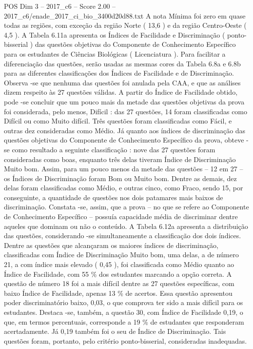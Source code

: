 \begin{textsample}{POS Dim 3 – 2017\_c6 – Score 2.00 – 2017\_c6/enade\_2017\_ci\_bio\_3400d20d88.txt}
A nota Mínima foi zero em quase todas as regiões, com exceção da região Norte ( 13,6 ) e da região Centro-Oeste ( 4,5 ).
A Tabela 6.11a apresenta os Índices de Facilidade e Discriminação ( ponto-bisserial ) das questões objetivas do Componente de Conhecimento Específico para os estudantes de Ciências Biológicas ( Licenciatura ).
Para facilitar a diferenciação das questões, serão usadas as mesmas cores da Tabela 6.8a e 6.8b para as diferentes classificações dos Índices de Facilidade e de Discriminação.
Observa -se que nenhuma das questões foi anulada pela CAA, e que as análises dizem respeito às 27 questões válidas.
A partir do Índice de Facilidade obtido, pode -se concluir que um pouco mais da metade das questões objetivas da prova foi considerada, pelo menos, Difícil : das 27 questões, 14 foram classificadas como Difícil ou como Muito difícil.
Três questões foram classificadas como Fácil, e outras dez consideradas como Médio.
Já quanto aos índices de discriminação das questões objetivas do Componente de Conhecimento Específico da prova, obteve -se como resultado a seguinte classificação : nove das 27 questões foram consideradas como boas, enquanto três delas tiveram Índice de Discriminação Muito bom.
Assim, para um pouco menos da metade das questões – 12 em 27 – os Índices de Discriminação foram Bom ou Muito bom.
Dentre as demais, dez delas foram classificadas como Médio, e outras cinco, como Fraco, sendo 15, por conseguinte, a quantidade de questões nos dois patamares mais baixos de discriminação.
Constata -se, assim, que a prova – no que se refere ao Componente de Conhecimento Específico – possuía capacidade média de discriminar dentre aqueles que dominam ou não o conteúdo.
A Tabela 6.12a apresenta a distribuição das questões, considerando -se simultaneamente a classificação dos dois índices.
Dentre as questões que alcançaram os maiores índices de discriminação, classificadas com Índice de Discriminação Muito bom, uma delas, a de número 21, a com índice mais elevado ( 0,45 ), foi classificada como Médio quanto ao Índice de Facilidade, com 55 \% dos estudantes marcando a opção correta.
A questão de número 18 foi a mais difícil dentre as 27 questões específicas, com baixo Índice de Facilidade, apenas 13 \% de acertos.
Essa questão apresentou poder discriminatório baixo, 0,03, o que comprova ter sido a mais difícil para os estudantes.
Destaca -se, também, a questão 30, com Índice de Facilidade 0,19, o que, em termos percentuais, corresponde a 19 \% de estudantes que responderam acertadamente.
Já 0,19 também foi o seu de Índice de Discriminação.
Tais questões foram, portanto, pelo critério ponto-bisserial, consideradas inadequadas.

\end{textsample}
